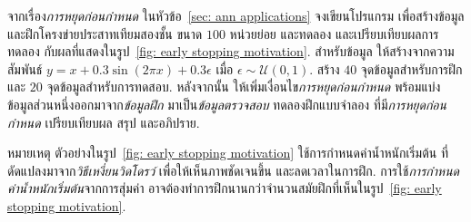 {\begin{shaded}
\vspace{1cm}
\begin{Parallel}[c]{0.5\textwidth}{0.45\textwidth}
\end{Parallel}



	\end{shaded}
}%
	

\begin{Exercise}
\label{ex: early stopping}

จากเรื่อง\textit{การหยุดก่อนกำหนด} 
ในหัวข้อ~\ref{sec: ann applications}
จงเขียนโปรแกรม เพื่อสร้างข้อมูล
และฝึกโครงข่ายประสาทเทียมสองชั้น
ขนาด $100$ หน่วยย่อย
และทดลอง
และเปรียบเทียบผลการทดลอง
กับผลที่แสดงในรูป~\ref{fig: early stopping motivation}.
สำหรับข้อมูล ให้สร้างจากความสัมพันธ์ 
$y = x + 0.3 \sin (2 \pi x) + 0.3 \epsilon$
เมื่อ $\epsilon \sim \mathcal{U}(0,1)$.
สร้าง $40$ จุดข้อมูลสำหรับการฝึก
และ $20$ จุดข้อมูลสำหรับการทดสอบ.
หลังจากนั้น ให้เพิ่มเงื่อนไข\textit{การหยุดก่อนกำหนด}
พร้อมแบ่งข้อมูลส่วนหนึ่งออกมาจาก\textit{ข้อมูลฝึก} มาเป็น\textit{ข้อมูลตรวจสอบ}
ทดลองฝึกแบบจำลอง ที่มี\textit{การหยุดก่อนกำหนด}
เปรียบเทียบผล สรุป และอภิปราย.

หมายเหตุ
ตัวอย่างในรูป~\ref{fig: early stopping motivation}
ใช้การกำหนดค่าน้ำหนักเริ่มต้น 
ที่ดัดแปลงมาจาก\textit{วิธีเหงี่ยนวิดโดรว์}
เพื่อให้เห็นภาพชัดเจนขึ้น และลดเวลาในการฝึก.
การใช้\textit{การกำหนดค่าน้ำหนักเริ่มต้น}จากการสุ่มค่า
อาจต้องทำการฝึกนานกว่าจำนวนสมัยฝึกที่เห็นในรูป~\ref{fig: early stopping motivation}.

\end{Exercise}

